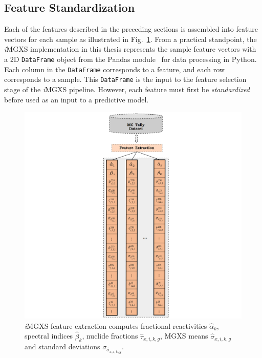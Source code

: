 \subsection{Feature Standardization}
\label{subsec:chap10-feature-standardize}

Each of the features described in the preceding sections is assembled into feature vectors for each sample as illustrated in Fig.~\ref{fig:chap10-features-example}. From a practical standpoint, the \textit{i}\ac{MGXS} implementation in this thesis represents the sample feature vectors with a 2D \texttt{DataFrame} object from the Pandas module~\cite{mckinney2010pandas} for data processing in Python. Each column in the \texttt{DataFrame} corresponds to a feature, and each row corresponds to a sample. This \texttt{DataFrame} is the input to the feature selection stage of the \textit{i}\ac{MGXS} pipeline. However, each feature must first be \textit{standardized} before used as an input to a predictive model.

\begin{figure}[h!]
\centering
\includegraphics[width=0.95\linewidth]{figures/unsupervised/features/engineering/features}
\vspace{2mm}
\caption[Example \textit{i}MGXS sample feature vectors]{\textit{i}\ac{MGXS} feature extraction computes fractional reactivities $\hat{\alpha}_{k}$, spectral indices $\hat{\beta}_{k}$, nuclide fractions $\hat{\tau}_{x,i,k,g}$, \ac{MGXS} means $\hat{\sigma}_{x,i,k,g}$ and standard deviations $\sigma_{\hat{\sigma}_{x,i,k,g}}$.}
\label{fig:chap10-features-example}
\end{figure}

